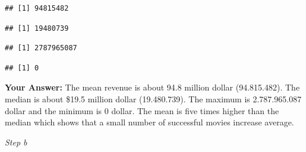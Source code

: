 \documentclass[
]{article}
\newenvironment{Shaded}{\begin{snugshade}}{\end{snugshade}}
\newcommand{\CommentTok}[1]{\textcolor[rgb]{0.56,0.35,0.01}{\textit{#1}}}
\newcommand{\FunctionTok}[1]{\textcolor[rgb]{0.13,0.29,0.53}{\textbf{#1}}}
\newcommand{\NormalTok}[1]{#1}
\newcommand{\SpecialCharTok}[1]{\textcolor[rgb]{0.81,0.36,0.00}{\textbf{#1}}}
\newcommand{\StringTok}[1]{\textcolor[rgb]{0.31,0.60,0.02}{#1}}
\begin{document}
\begin{Shaded}
\end{Shaded}

\begin{verbatim}
## [1] 94815482
\end{verbatim}

\begin{Shaded}
\end{Shaded}

\begin{verbatim}
## [1] 19480739
\end{verbatim}

\begin{Shaded}
\end{Shaded}

\begin{verbatim}
## [1] 2787965087
\end{verbatim}

\begin{Shaded}
\end{Shaded}

\begin{verbatim}
## [1] 0
\end{verbatim}

\textbf{Your Answer:} The mean revenue is about 94.8 million dollar
(94.815.482). The median is about \$19.5 million dollar (19.480.739).
The maximum is 2.787.965.087 dollar and the minimum is 0 dollar. The
mean is five times higher than the median which shows that a small
number of successful movies increase average.

\emph{Step b}

\begin{Shaded}
\end{Shaded}
\end{document}
